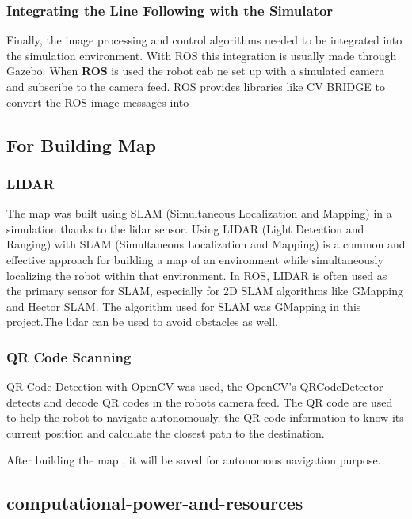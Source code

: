 \documentclass[../../main]{subfiles}
\begin{document}
    \subsubsection{Integrating the Line Following with the Simulator}
    
    Finally, the image processing and control algorithms needed to be
    integrated into the simulation environment. With ROS this integration is
    usually made through Gazebo. When \textbf{ROS} is used the robot cab ne
    set up with a simulated camera and subscribe to the camera feed. ROS
    provides libraries like CV BRIDGE to convert the ROS image messages into
    
    \subsection{For Building Map}
    
    \subsubsection{LIDAR}
    
    The map was built using SLAM (Simultaneous Localization and Mapping) in
    a simulation thanks to the lidar sensor. Using LIDAR (Light Detection
    and Ranging) with SLAM (Simultaneous Localization and Mapping) is a
    common and effective approach for building a map of an environment while
    simultaneously localizing the robot within that environment. In ROS,
    LIDAR is often used as the primary sensor for SLAM, especially for 2D
    SLAM algorithms like GMapping and Hector SLAM. The algorithm used for
    SLAM was GMapping in this project.The lidar can be used to avoid
    obstacles as well.
    
    \subsubsection{QR Code Scanning}
    
    QR Code Detection with OpenCV was used, the OpenCV's QRCodeDetector
    detects and decode QR codes in the robot\textquotesingle s camera feed.
    The QR code are used to help the robot to navigate autonomously, the QR
    code information to know its current position and calculate the closest
    path to the destination.
    
    After building the map , it will be saved for autonomous navigation
    purpose.
    
    
  \subsection{computational-power-and-resources}    
\end{document}
